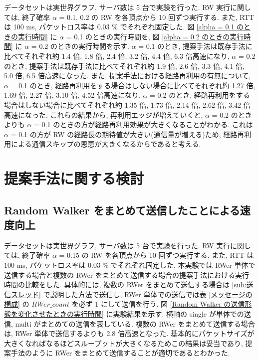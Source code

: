 データセットは実世界グラフ, サーバ数は 5 台で実験を行った. RW 実行に関しては, 終了確率 $\alpha$ = 0.1, 0.2 の RW を各頂点から 10 回ずつ実行する. また, RTT は 100 ms, パケットロス率は 0.03 \% でそれぞれ固定した. 図 \ref{alpha = 0.1 のときの実行時間} に $\alpha$ = 0.1 のときの実行時間を, 図 \ref{alpha = 0.2 のときの実行時間} に $\alpha$ = 0.2 のときの実行時間を示す. $\alpha$ = 0.1 のとき, 提案手法は既存手法に比べてそれぞれ約 1.4 倍, 1.8 倍, 2.4 倍, 3.2 倍, 4.4 倍, 6.3 倍高速になり, $\alpha$ = 0.2 のとき, 提案手法は既存手法に比べてそれぞれ約 1.9 倍, 2.6 倍, 3.3 倍, 4.1 倍, 5.0 倍, 6.5 倍高速になった. また, 提案手法における経路再利用の有無について, $\alpha$ = 0.1 のとき, 経路再利用をする場合はしない場合に比べてそれぞれ約 1.27 倍, 1.69 倍, 2.27 倍, 3.10 倍, 4.52 倍高速になり, $\alpha$ = 0.2 のとき, 経路再利用をする場合はしない場合に比べてそれぞれ約 1.35 倍, 1.73 倍, 2.14 倍, 2.62 倍, 3.42 倍高速になった. これらの結果から, 再利用エッジが増えていくと, $\alpha$ = 0.2 のときよりも $\alpha$ = 0.1 のときの方が経路再利用効果が大きくなることがわかる. これは $\alpha$ = 0.1 の方が RW の経路長の期待値が大きい(通信量が増える)ため, 経路再利用による通信スキップの恩恵が大きくなるからであると考える.

\section{提案手法に関する検討}

\subsection{Random Walker をまとめて送信したことによる速度向上}\label{Random Walker をまとめて送信した場合とそうでない場合の実行時間}

データセットは実世界グラフ, サーバ数は 5 台で実験を行った. RW 実行に関しては, 終了確率 $\alpha$ = 0.15 の RW を各頂点から 10 回ずつ実行する. また, RTT は 100 ms, パケットロス率は 0.03 \% でそれぞれ固定した. 本実験では RWer 単体で送信する場合と複数の RWer をまとめて送信する場合の提案手法における実行時間の比較をした. 具体的には, 複数の RWer をまとめて送信する場合は \ref{sub:送信スレッド} で説明した方法で送信し, RWer 単体での送信では表 \ref{メッセージの構成} の $RWer\_count$ を必ず 1 にして送信を行う. 図 \ref{Random Walker の送信形態を変化させたときの実行時間} に実験結果を示す. 横軸の single が単体での送信, multi がまとめての送信を表している. 複数の RWer をまとめて送信する場合は, RWer 単体で送信するよりも 2.8 倍高速となった. 基本的にパケットサイズが大きくなればなるほどスループットが大きくなるためこの結果は妥当であり, 提案手法のように RWer をまとめて送信することが適切であるとわかった. 

